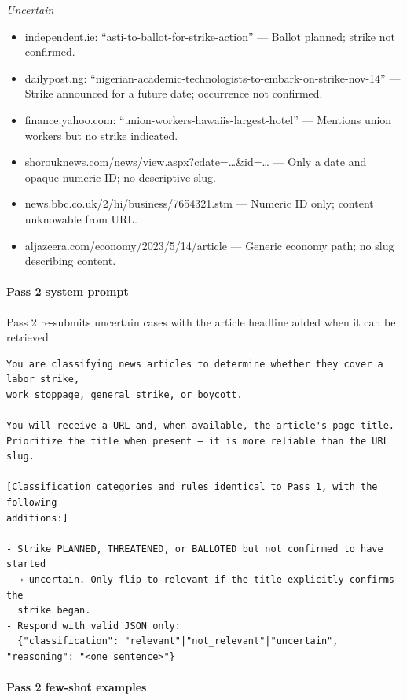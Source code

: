 \documentclass[
  11pt,
]{article}
\providecommand{\tightlist}{%
  \setlength{\itemsep}{0pt}\setlength{\parskip}{0pt}}
\begin{document}
\emph{Uncertain}

\begin{itemize}
\tightlist
\item
  independent.ie: ``asti-to-ballot-for-strike-action'' --- Ballot
  planned; strike not confirmed.
\item
  dailypost.ng:
  ``nigerian-academic-technologists-to-embark-on-strike-nov-14'' ---
  Strike announced for a future date; occurrence not confirmed.
\item
  finance.yahoo.com: ``union-workers-hawaiis-largest-hotel'' ---
  Mentions union workers but no strike indicated.
\item
  shorouknews.com/news/view.aspx?cdate=\ldots\&id=\ldots{} --- Only a
  date and opaque numeric ID; no descriptive slug.
\item
  news.bbc.co.uk/2/hi/business/7654321.stm --- Numeric ID only; content
  unknowable from URL.
\item
  aljazeera.com/economy/2023/5/14/article --- Generic economy path; no
  slug describing content.
\end{itemize}

\paragraph{Pass 2 system prompt}\label{pass-2-system-prompt}

Pass 2 re-submits uncertain cases with the article headline added when
it can be retrieved.

\begin{verbatim}
You are classifying news articles to determine whether they cover a labor strike,
work stoppage, general strike, or boycott.

You will receive a URL and, when available, the article's page title.
Prioritize the title when present — it is more reliable than the URL slug.

[Classification categories and rules identical to Pass 1, with the following
additions:]

- Strike PLANNED, THREATENED, or BALLOTED but not confirmed to have started
  → uncertain. Only flip to relevant if the title explicitly confirms the
  strike began.
- Respond with valid JSON only:
  {"classification": "relevant"|"not_relevant"|"uncertain", "reasoning": "<one sentence>"}
\end{verbatim}

\paragraph{Pass 2 few-shot examples}\label{pass-2-few-shot-examples}
\end{document}
